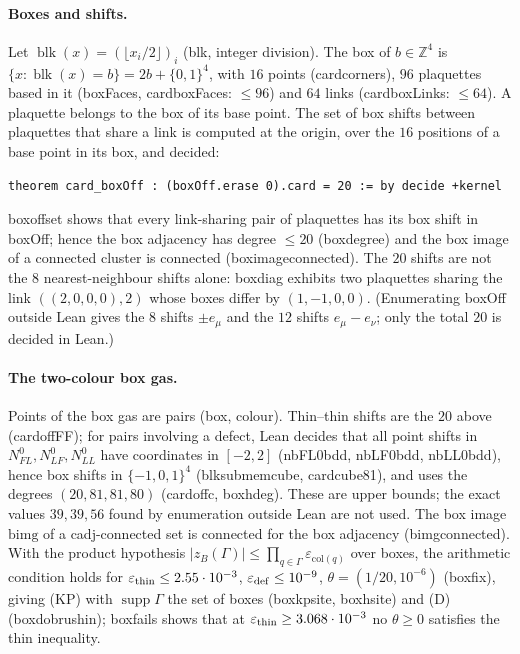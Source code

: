 \documentclass[11pt,a4paper]{article}
\theoremstyle{definition}
\theoremstyle{remark}
\DeclareRobustCommand{\lean}[1]{{\ttfamily\renewcommand{\_}{\textunderscore\allowbreak}#1}}
\newenvironment{leanquote}{\par\smallskip\footnotesize}{\par\smallskip}
\newcommand{\Z}{\mathbb{Z}}
\newcommand{\supp}{\operatorname{supp}}
\newcommand{\blk}{\operatorname{blk}}
\begin{document}
\paragraph{Boxes and shifts.} Let $\blk(x)=(\lfloor x_i/2\rfloor)_i$ (\lean{blk}, integer division). The box of $b\in\Z^4$ is $\{x:\blk(x)=b\}=2b+\{0,1\}^4$, with $16$ points (\lean{card\_corners}), $96$ plaquettes based in it (\lean{boxFaces}, \lean{card\_boxFaces}: $\le96$) and $64$ links (\lean{card\_boxLinks}: $\le64$). A plaquette belongs to the box of its base point. The set of box shifts between plaquettes that share a link is computed at the origin, over the $16$ positions of a base point in its box, and decided:
\begin{leanquote}
\begin{verbatim}
theorem card_boxOff : (boxOff.erase 0).card = 20 := by decide +kernel
\end{verbatim}
\end{leanquote}
\lean{box\_offset} shows that every link-sharing pair of plaquettes has its box shift in \lean{boxOff}; hence the box adjacency has degree $\le20$ (\lean{box\_degree}) and the box image of a connected cluster is connected (\lean{box\_image\_connected}). The $20$ shifts are not the $8$ nearest-neighbour shifts alone: \lean{box\_diag} exhibits two plaquettes sharing the link $((2,0,0,0),2)$ whose boxes differ by $(1,-1,0,0)$. (Enumerating \lean{boxOff} outside Lean gives the $8$ shifts $\pm e_\mu$ and the $12$ shifts $e_\mu-e_\nu$; only the total $20$ is decided in Lean.)

\paragraph{The two-colour box gas.} Points of the box gas are pairs (box, colour). Thin--thin shifts are the $20$ above (\lean{card\_offFF}); for pairs involving a defect, Lean decides that all point shifts in $N_{FL}^0,N_{LF}^0,N_{LL}^0$ have coordinates in $[-2,2]$ (\lean{nbFL0\_bdd}, \lean{nbLF0\_bdd}, \lean{nbLL0\_bdd}), hence box shifts in $\{-1,0,1\}^4$ (\lean{blk\_sub\_mem\_cube}, \lean{card\_cube81}), and uses the degrees $(20,81,81,80)$ (\lean{card\_offc}, \lean{box\_hdeg}). These are upper bounds; the exact values $39,39,56$ found by enumeration outside Lean are not used. The box image $\mathrm{bimg}$ of a \lean{cadj}-connected set is connected for the box adjacency (\lean{bimg\_connected}). With the product hypothesis $|z_B(\Gamma)|\le\prod_{q\in\Gamma}\varepsilon_{\mathrm{col}(q)}$ over boxes, the arithmetic condition holds for $\varepsilon_{\rm thin}\le2.55\cdot10^{-3}$, $\varepsilon_{\rm def}\le10^{-9}$, $\theta=(1/20,10^{-6})$ (\lean{box\_fix}), giving (KP) with $\supp\Gamma$ the set of boxes (\lean{box\_kp\_site}, \lean{box\_hsite}) and (D) (\lean{box\_dobrushin}); \lean{box\_fails} shows that at $\varepsilon_{\rm thin}\ge3.068\cdot10^{-3}$ no $\theta\ge0$ satisfies the thin inequality.
\end{document}
